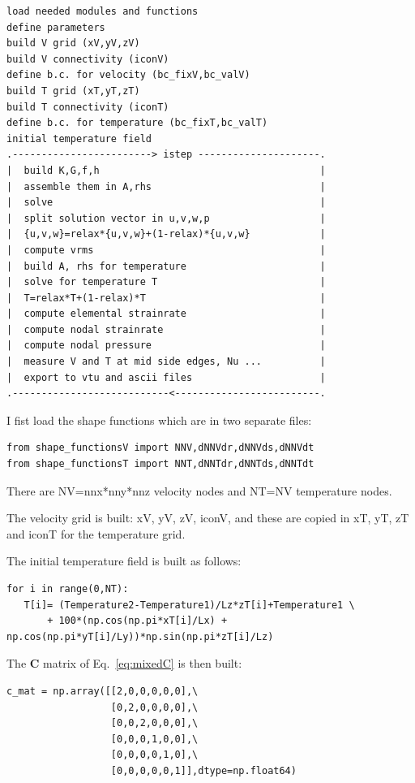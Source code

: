\begin{verbatim}
load needed modules and functions
define parameters
build V grid (xV,yV,zV)
build V connectivity (iconV)
define b.c. for velocity (bc_fixV,bc_valV)
build T grid (xT,yT,zT)
build T connectivity (iconT)
define b.c. for temperature (bc_fixT,bc_valT)
initial temperature field
.------------------------> istep ---------------------.
|  build K,G,f,h                                      |
|  assemble them in A,rhs                             |
|  solve                                              |
|  split solution vector in u,v,w,p                   |
|  {u,v,w}=relax*{u,v,w}+(1-relax)*{u,v,w}            |
|  compute vrms                                       |
|  build A, rhs for temperature                       |
|  solve for temperature T                            |
|  T=relax*T+(1-relax)*T                              |
|  compute elemental strainrate                       |
|  compute nodal strainrate                           |
|  compute nodal pressure                             |
|  measure V and T at mid side edges, Nu ...          |
|  export to vtu and ascii files                      | 
.---------------------------<-------------------------.
\end{verbatim}

I fist load the shape functions which are in two separate files:

\begin{lstlisting}
from shape_functionsV import NNV,dNNVdr,dNNVds,dNNVdt
from shape_functionsT import NNT,dNNTdr,dNNTds,dNNTdt
\end{lstlisting}

There are NV=nnx*nny*nnz velocity nodes and NT=NV temperature nodes.

The velocity grid is built: xV, yV, zV, iconV, and 
these are copied in xT, yT, zT and iconT for the temperature grid.  

The initial temperature field is built as follows:
\begin{lstlisting}
for i in range(0,NT):
   T[i]= (Temperature2-Temperature1)/Lz*zT[i]+Temperature1 \
       + 100*(np.cos(np.pi*xT[i]/Lx) + np.cos(np.pi*yT[i]/Ly))*np.sin(np.pi*zT[i]/Lz)
\end{lstlisting}

The ${\bm C}$ matrix of Eq.~\eqref{eq:mixedC} is then built:
\begin{lstlisting}
c_mat = np.array([[2,0,0,0,0,0],\
                  [0,2,0,0,0,0],\
                  [0,0,2,0,0,0],\
                  [0,0,0,1,0,0],\
                  [0,0,0,0,1,0],\
                  [0,0,0,0,0,1]],dtype=np.float64) 
\end{lstlisting}


